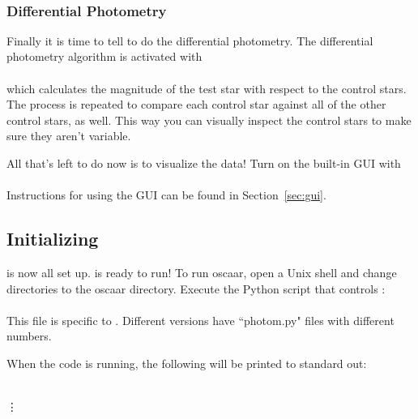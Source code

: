 \documentclass{article}
\begin{document}
\indent {}\\


\subsubsection{Differential Photometry}

Finally it is time to tell \oscaar  to do the differential photometry. The differential photometry algorithm is activated with \\

\indent {}\\

\noindent which calculates the magnitude of the test star with respect to the control stars. The process is repeated to compare each control star against all of the other control stars, as well. This way you can visually inspect the control stars to make sure they aren't variable. 

All that's left to do now is to visualize the data!  Turn on the built-in GUI with\\

\indent {}\\

\noindent Instructions for using the GUI can be found in Section~\ref{sec:gui}. \\


\subsection{Initializing \oscaar}

 is now all set up. \oscaar  is ready to run! To run oscaar, open a Unix shell and change directories to the oscaar directory. Execute the Python script that controls \oscaar : \\

\indent {} \\

\noindent This file is specific to . Different versions have ``photom.py" files with different numbers. 

When the code is running, the following will be printed to standard out: \\

{\addtolength{\leftskip}{10 mm}
{\scriptsize
\noindent {} \\
 \vdots

	}
}
\end{document}
